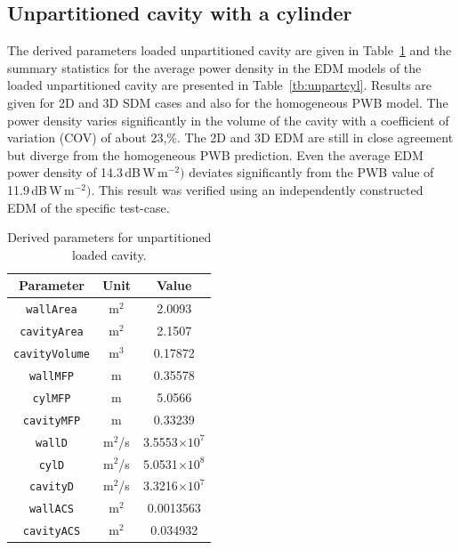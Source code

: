 \documentclass[a4paper]{article}
\numberwithin{equation}{section}
\newcounter{Table}
\begin{document}
\subsection[Unpartitioned cavity with a cylinder]{Unpartitioned cavity with a cylinder}
\label{sc:res:unpartcyl}

The derived parameters loaded unpartitioned cavity are given in Table~\ref{tb:derivparamsl} and the 
summary statistics for the average power density in the EDM models of the loaded unpartitioned cavity
are presented in Table~\ref{tb:unpartcyl}. Results are given for 2D and 3D SDM cases and also for the 
homogeneous PWB model. The power density varies significantly in the volume of the cavity with a coefficient 
of variation (COV) of about 23,\%. The 2D and 3D EDM are still in close agreement but diverge from the homogeneous
PWB prediction. Even the average EDM power density of 14.3\,dB\,W\,m$^{-2})$ deviates significantly from the PWB value
of 11.9\,dB\,W\,m$^{-2})$. This result was verified using an independently constructed EDM of the specific test-case. 

\begin{table}[ht]
\begin{center}
\begin{tabular}{|c|c|c|}
\hline
\textbf{Parameter}     &\textbf{Unit} &\textbf{Value}\\ 
\hline
\texttt{wallArea}      &m$^2$         &2.0093              \\
\texttt{cavityArea}    &m$^2$         &2.1507              \\
\texttt{cavityVolume}  &m$^3$         &0.17872             \\
\texttt{wallMFP}       &m             &0.35578             \\
\texttt{cylMFP}        &m             &5.0566              \\
\texttt{cavityMFP}     &m             &0.33239             \\
\texttt{wallD}         &m$^2$/s       &3.5553$\times 10^7$ \\
\texttt{cylD}          &m$^2$/s       &5.0531$\times 10^8$ \\
\texttt{cavityD}       &m$^2$/s       &3.3216$\times 10^7$ \\
\texttt{wallACS}       &m$^2$         &0.0013563           \\
\texttt{cavityACS}     &m$^2$         &0.034932            \\
\hline
\end{tabular}
\end{center}
\caption{\label{tb:derivparamsl} Derived parameters for unpartitioned loaded cavity.}
\end{table}
\end{document}
